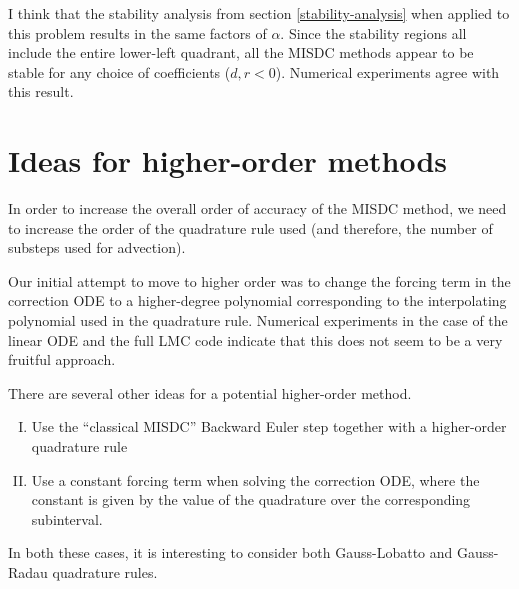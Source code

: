 \documentclass[12pt]{article}
\begin{document}
I think that the stability analysis from section \ref{stability-analysis} when 
applied to this problem results in the same factors of $\alpha$. Since the 
stability regions all include the entire lower-left quadrant, all the MISDC 
methods appear to be stable for any choice of coefficients ($d,r < 0$). 
Numerical experiments agree with this result.

\section{Ideas for higher-order methods}
In order to increase the overall order of accuracy of the MISDC method, we need 
to increase the order of the quadrature rule used (and therefore, the number of 
substeps used for advection).

Our initial attempt to move to higher order was to change the forcing term in 
the correction ODE to a higher-degree polynomial corresponding to the 
interpolating polynomial used in the quadrature rule. Numerical experiments in 
the case of the linear ODE and the full LMC code indicate that this does not 
seem to be a very fruitful approach.

There are several other ideas for a potential higher-order method.
\begin{enumerate}[I.]
    \item  Use the ``classical MISDC'' Backward Euler step together with a 
           higher-order quadrature rule \label{high-order-misdc}
    \item  Use a constant forcing term when solving the correction ODE, where 
           the constant is given by the value of the quadrature over the 
           corresponding subinterval. \label{const-ode-quadrature}
\end{enumerate}
In both these cases, it is interesting to consider both Gauss-Lobatto and 
Gauss-Radau quadrature rules.
\end{document}
